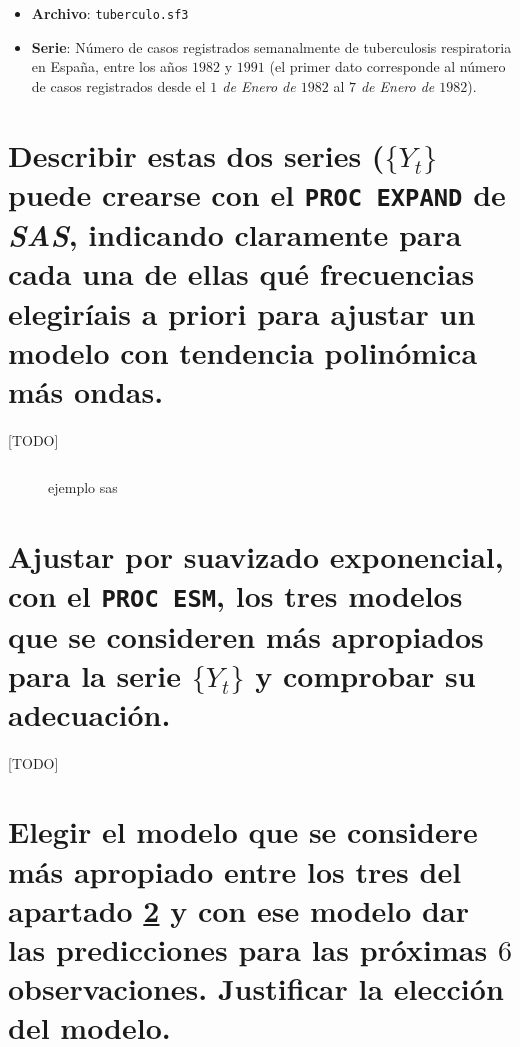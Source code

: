 \documentclass[a4paper, spanish]{article}
\begin{document}
  \maketitle

  \begin{itemize}
    \item \textbf{Archivo}: \texttt{tuberculo.sf3}
    \item \textbf{Serie}: Número de casos registrados semanalmente de tuberculosis respiratoria en España, entre los años $1982$ y $1991$ (el primer dato corresponde al número de casos registrados desde el \emph{$1$ de Enero de $1982$} al \emph{$7$ de Enero de $1982$}).
  \end{itemize}

  \section{Describir estas dos series ($\{Y_t\}$ puede crearse con el \texttt{PROC EXPAND} de \emph{SAS}, indicando claramente para cada una de ellas qué frecuencias elegiríais a priori para ajustar un modelo con tendencia polinómica más ondas.}
  \label{sec:a}
    \paragraph{}
    [TODO]


    \begin{figure}[h]
      \centering
      \inputminted{SAS}{./res/code/example.sas}
      \caption{ejemplo sas}
      \label{code:example}
    \end{figure}


  \section{Ajustar por suavizado exponencial, con el \texttt{PROC ESM}, los tres modelos que se consideren más apropiados para la serie $\{Y_t\}$ y comprobar su adecuación.}
  \label{sec:b}
    \paragraph{}
    [TODO]


  \section{Elegir el modelo que se considere más apropiado entre los tres del apartado \ref{sec:b} y con ese modelo dar las predicciones para las próximas $6$ observaciones. Justificar la elección del modelo.}
  \label{sec:c}
\end{document}
